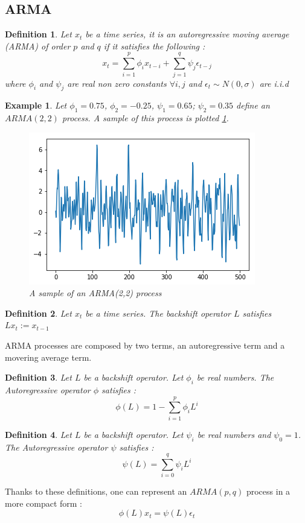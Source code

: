 \documentclass{article}
\newtheorem{ex}{Example}[section]
\newtheorem{Def}{Definition}[section]
\begin{document}
\subsection{ARMA}
\begin{Def}\label{ARMA}
Let $x_t$ be a time series, it is an autoregressive moving average (ARMA) of order $p$ and $q$ if it satisfies the following : 
\begin{equation*}\label{ARMA(p,q)}
x_{t}=\sum_{i=1}^{p}\phi_ix_{t-i}+\sum_{j=1}^{q}\psi_j\epsilon_{t-j} 
\end{equation*}
where $\phi_i$ and $\psi_j$ are real non zero constants $\forall i,j$ and $\epsilon_t\sim N(0,\sigma)$ are i.i.d
\end{Def}
\begin{ex} Let $\phi_1=0.75$, $\phi_2=-0.25$, $\psi_1=0.65$; $\psi_2=0.35$ define an $ARMA(2,2)$ process. A sample of this process is plotted \ref{fig:ARMA(2,2)_sample}. 
\begin{figure}
    \includegraphics[width=\textwidth]{ARMA(2,2).png}
    \caption{A sample of an ARMA(2,2) process}
    \label{fig:ARMA(2,2)_sample}
\end{figure}
\end{ex}
\begin{Def}\label{backshift}
Let $x_t$ be a time series. The backshift operator $L$ satisfies $Lx_t:=x_{t-1}$
\end{Def}
ARMA processes are composed by two terms, an autoregressive term and a movering average term. 
\begin{Def}Let $L$ be a backshift operator. Let $\phi_i$ be real numbers. The Autoregressive operator $\phi$ satisfies : 
\begin{equation*}
    \phi(L)=1-\sum_{i=1}^{p}\phi_i L^{i}
\end{equation*}
\end{Def}
\begin{Def}
Let $L$ be a backshift operator. Let $\psi_i$ be real numbers and $\psi_0=1$. The Autoregressive operator $\psi$ satisfies : 
\begin{equation*}
    \psi(L)=\sum_{i=0}^{q}\psi_i L^{i}
\end{equation*}
\end{Def}
Thanks to these definitions, one can represent an $ARMA(p,q)$ process in a more compact form : 
\begin{equation*}
    \phi(L)x_t=\psi(L)\epsilon_t
\end{equation*}
\end{document}

